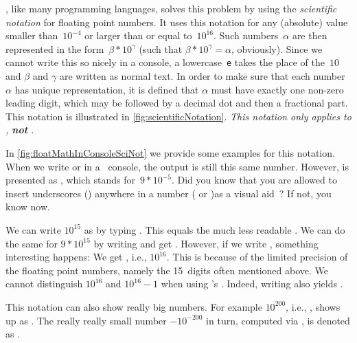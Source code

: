 \python, like many programming languages, solves this problem by using the \emph{scientific notation} for floating point numbers.
It uses this notation for any (absolute)  value smaller than~$10^{-4}$ or larger than or equal to~$10^{16}$.
Such numbers~$\alpha$ are then represented in the form~$\beta*10^{\gamma}$ (such that $\beta*10^{\gamma}=\alpha$, obviously).
Since we cannot write this so nicely in a console, a lowercase~\texttt{e} takes the place of the~$10$ and $\beta$ and $\gamma$ are written as normal text.
In order to make sure that each number~$\alpha$ has unique representation, it is defined that $\alpha$ must have exactly one non-zero leading digit, which may be followed by a decimal dot and then a fractional part.
This notation is illustrated in \cref{fig:scientificNotation}.
\emph{This notation only applies to , \textbf{not} .}

In \cref{fig:floatMathInConsoleSciNot} we provide some examples for this notation.
When we write  or  in a \python\ console, the output is still this same number.
However,  is presented as , which stands for~$9*10^{-5}$.%
%
Did you know that you are allowed to insert underscores (\pythonil{_}\pythonIdx{\_}) anywhere in a number ( or )as a visual aid~\cite{PEP515}?
If not, you know now.
%
%
\begin{sloppypar}%
We can write $10^{15}$ as  by typing .
This equals the much less readable .
We can do the same for $9*10^{15}$ by writing  and get .
However, if we write , something interesting happens:
We get , i.e., $10^{16}$.
This is because of the limited precision of the floating point numbers, namely the 15~digits often mentioned above.
We cannot distinguish $10^{16}$ and $10^{16}-1$ when using \python's .
Indeed, writing  also yields .%
\end{sloppypar}%
%
This notation can also show really big numbers.
For example $10^{200}$, i.e., , shows up as .
The really really small number $-10^{-200}$ in turn, computed via , is denoted as .

